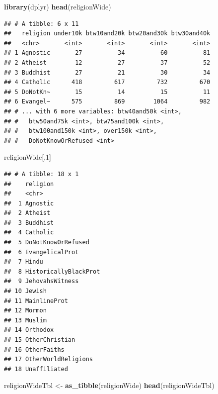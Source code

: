 \documentclass[
]{krantz}
\newenvironment{Shaded}{\begin{snugshade}}{\end{snugshade}}
\newcommand{\DecValTok}[1]{\textcolor[rgb]{0.00,0.00,0.81}{#1}}
\newcommand{\KeywordTok}[1]{\textcolor[rgb]{0.13,0.29,0.53}{\textbf{#1}}}
\newcommand{\NormalTok}[1]{#1}
\newcommand{\StringTok}[1]{\textcolor[rgb]{0.31,0.60,0.02}{#1}}
\begin{document}
\begin{Shaded}
\begin{Highlighting}[]
\KeywordTok{library}\NormalTok{(dplyr)}
\KeywordTok{head}\NormalTok{(religionWide)}
\end{Highlighting}
\end{Shaded}

\begin{verbatim}
## # A tibble: 6 x 11
##   religion under10k btw10and20k btw20and30k btw30and40k
##   <chr>       <int>       <int>       <int>       <int>
## 1 Agnostic       27          34          60          81
## 2 Atheist        12          27          37          52
## 3 Buddhist       27          21          30          34
## 4 Catholic      418         617         732         670
## 5 DoNotKn~       15          14          15          11
## 6 Evangel~      575         869        1064         982
## # ... with 6 more variables: btw40and50k <int>,
## #   btw50and75k <int>, btw75and100k <int>,
## #   btw100and150k <int>, over150k <int>,
## #   DoNotKnowOrRefused <int>
\end{verbatim}

\begin{Shaded}
\begin{Highlighting}[]
\NormalTok{religionWide[,}\DecValTok{1}\NormalTok{]}
\end{Highlighting}
\end{Shaded}

\begin{verbatim}
## # A tibble: 18 x 1
##    religion             
##    <chr>                
##  1 Agnostic             
##  2 Atheist              
##  3 Buddhist             
##  4 Catholic             
##  5 DoNotKnowOrRefused   
##  6 EvangelicalProt      
##  7 Hindu                
##  8 HistoricallyBlackProt
##  9 JehovahsWitness      
## 10 Jewish               
## 11 MainlineProt         
## 12 Mormon               
## 13 Muslim               
## 14 Orthodox             
## 15 OtherChristian       
## 16 OtherFaiths          
## 17 OtherWorldReligions  
## 18 Unaffiliated
\end{verbatim}

\begin{Shaded}
\begin{Highlighting}[]
\NormalTok{religionWideTbl \textless{}{-}}\StringTok{ }\KeywordTok{as\_tibble}\NormalTok{(religionWide)}
\KeywordTok{head}\NormalTok{(religionWideTbl)}
\end{Highlighting}
\end{Shaded}
\end{document}

